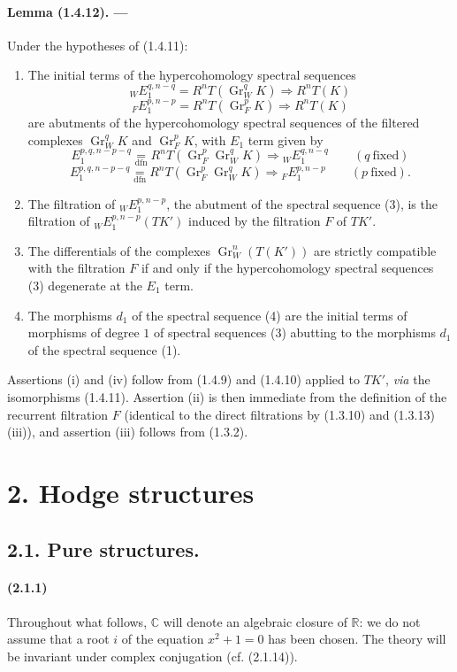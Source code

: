 \documentclass[10pt]{article}
\newcommand{\C}{\mathbb C}
\newcommand{\Gr}{\operatorname{Gr}}
\newcommand{\R}{\mathbb R}
\begin{document}
\paragraph{Lemma (1.4.12). ---} Under the hypotheses of (1.4.11):
\begin{enumerate}[label=(\roman*)]
\item The initial terms of the hypercohomology spectral sequences
\[
\tag{1}
{}_WE_1^{q,n-q}=R^nT(\Gr_W^qK)\Rightarrow R^nT(K)
\]
\[
\tag{2}
{}_FE_1^{p,n-p}=R^nT(\Gr_F^pK)\Rightarrow R^nT(K)
\]
are abutments of the hypercohomology spectral sequences of the filtered complexes $\Gr_W^qK$ and $\Gr_F^pK$, with $E_1$ term given by
\[
\tag{3}
E_1^{p,q,n-p-q}\underset{\mathrm{dfn}}{=}R^nT(\Gr_F^p\Gr_W^qK)\Rightarrow {}_WE_1^{q,n-q}\qquad(q\ \text{fixed})
\]
\[
\tag{4}
E_1^{p,q,n-p-q}\underset{\mathrm{dfn}}{=}R^nT(\Gr_F^p\Gr_W^qK)\Rightarrow {}_FE_1^{p,n-p}\qquad(p\ \text{fixed}).
\]
\item The filtration of ${}_WE_1^{p,n-p}$, the abutment of the spectral sequence (3), is the filtration of ${}_WE_1^{p,n-p}(TK')$ induced by the filtration $F$ of $TK'$.
\item The differentials of the complexes $\Gr_W^n(T(K'))$ are strictly compatible with the filtration $F$ if and only if the hypercohomology spectral sequences (3) degenerate at the $E_1$ term.
\item The morphisms $d_1$ of the spectral sequence (4) are the initial terms of morphisms of degree $1$ of spectral sequences (3) abutting to the morphisms $d_1$ of the spectral sequence (1).
\end{enumerate}
Assertions (i) and (iv) follow from (1.4.9) and (1.4.10) applied to $TK'$, \emph{via} the isomorphisms (1.4.11). Assertion (ii) is then immediate from the definition of the recurrent filtration $F$ (identical to the direct filtrations by (1.3.10) and (1.3.13) (iii)), and assertion (iii) follows from (1.3.2).

\section*{2. Hodge structures}
\subsection*{2.1. Pure structures.}

\paragraph{(2.1.1)} Throughout what follows, $\C$ will denote an algebraic closure of $\R$: we do not assume that a root $i$ of the equation $x^2+1=0$ has been chosen. The theory will be invariant under complex conjugation (cf. (2.1.14)).
\end{document}
